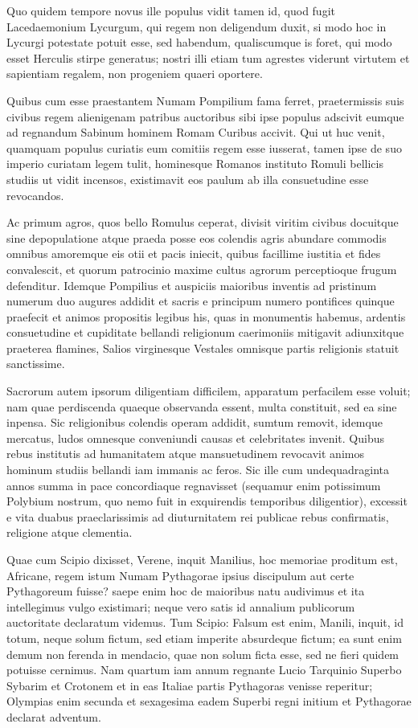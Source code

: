  Quo quidem tempore novus ille populus vidit tamen id, quod fugit Lacedaemonium Lycurgum, qui regem non deligendum duxit, si modo hoc in Lycurgi potestate potuit esse, sed habendum, qualiscumque is foret, qui modo esset Herculis stirpe generatus; nostri illi etiam tum agrestes viderunt virtutem et sapientiam regalem, non progeniem quaeri oportere.

 Quibus cum esse praestantem Numam Pompilium fama ferret, praetermissis suis civibus regem alienigenam patribus auctoribus sibi ipse populus adscivit eumque ad regnandum Sabinum hominem Romam Curibus accivit. Qui ut huc venit, quamquam populus curiatis eum comitiis regem esse iusserat, tamen ipse de suo imperio curiatam legem tulit, hominesque Romanos instituto Romuli bellicis studiis ut vidit incensos, existimavit eos paulum ab illa consuetudine esse revocandos.

 Ac primum agros, quos bello Romulus ceperat, divisit viritim civibus docuitque sine depopulatione atque praeda posse eos colendis agris abundare commodis omnibus amoremque eis otii et pacis iniecit, quibus facillime iustitia et fides convalescit, et quorum patrocinio maxime cultus agrorum perceptioque frugum defenditur. Idemque Pompilius et auspiciis maioribus inventis ad pristinum numerum duo augures addidit et sacris e principum numero pontifices quinque praefecit et animos propositis legibus his, quas in monumentis habemus, ardentis consuetudine et cupiditate bellandi religionum caerimoniis mitigavit adiunxitque praeterea flamines, Salios virginesque Vestales omnisque partis religionis statuit sanctissime.

 Sacrorum autem ipsorum diligentiam difficilem, apparatum perfacilem esse voluit; nam quae perdiscenda quaeque observanda essent, multa constituit, sed ea sine inpensa. Sic religionibus colendis operam addidit, sumtum removit, idemque mercatus, ludos omnesque conveniundi causas et celebritates invenit. Quibus rebus institutis ad humanitatem atque mansuetudinem revocavit animos hominum studiis bellandi iam immanis ac feros. Sic ille cum undequadraginta annos summa in pace concordiaque regnavisset (sequamur enim potissimum Polybium nostrum, quo nemo fuit in exquirendis temporibus diligentior), excessit e vita duabus praeclarissimis ad diuturnitatem rei publicae rebus confirmatis, religione atque clementia.

 Quae cum Scipio dixisset, Verene, inquit Manilius, hoc memoriae proditum est, Africane, regem istum Numam Pythagorae ipsius discipulum aut certe Pythagoreum fuisse? saepe enim hoc de maioribus natu audivimus et ita intellegimus vulgo existimari; neque vero satis id annalium publicorum auctoritate declaratum videmus. Tum Scipio: Falsum est enim, Manili, inquit, id totum, neque solum fictum, sed etiam imperite absurdeque fictum; ea sunt enim demum non ferenda in mendacio, quae non solum ficta esse, sed ne fieri quidem potuisse cernimus. Nam quartum iam annum regnante Lucio Tarquinio Superbo Sybarim et Crotonem et in eas Italiae partis Pythagoras venisse reperitur; Olympias enim secunda et sexagesima eadem Superbi regni initium et Pythagorae declarat adventum.

